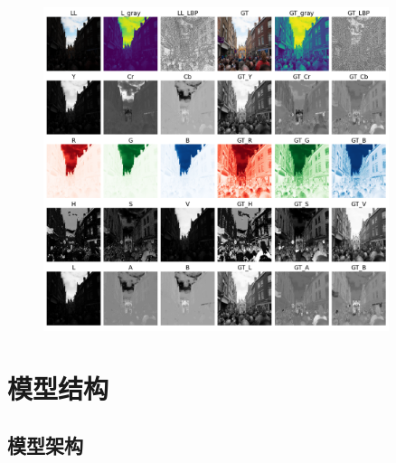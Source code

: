 \documentclass[CJK,aspectratio=169]{beamer}  %
\begin{document}
\begin{frame}
\begin{figure}
\begin{minipage}{.4\columnwidth}
\begin{itemize}
				\end{itemize}
			\end{minipage}
			\begin{minipage}{.5\columnwidth}
				\setlength{\abovecaptionskip}{-0.05cm}
				\centering
				\includegraphics[width=0.9\textwidth]{picture/LLIE/Experiment/myplot_different_color_channels_r097088c1t}
			\end{minipage}
		\end{figure}
	\end{frame}
	
	\section{模型结构}
	
	\subsection{模型架构}
	
\end{document}
